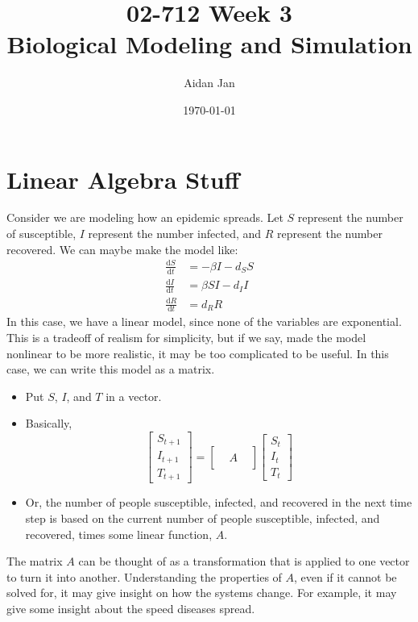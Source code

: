 \documentclass[10pt]{article}
\title{02-712 Week 3 \\ \large{Biological Modeling and Simulation}}
\author{Aidan Jan}
\date{\today}
\newcommand{\dd}{\text{d}}
\begin{document}
\maketitle

\section*{Linear Algebra Stuff}
Consider we are modeling how an epidemic spreads.  Let $S$ represent the number of susceptible, $I$ represent the number infected, and $R$ represent the number recovered.  We can maybe make the model like:
\begin{align*}
    \frac{\dd S}{\dd t} &= -\beta I - d_S S\\
    \frac{\dd I}{\dd t} &= \beta SI - d_I I\\
    \frac{\dd R}{\dd t} &= d_R R
\end{align*}
In this case, we have a linear model, since none of the variables are exponential.  This is a tradeoff of realism for simplicity, but if we say, made the model nonlinear to be more realistic, it may be too complicated to be useful.  In this case, we can write this model as a matrix.
\begin{itemize}
	\item Put $S$, $I$, and $T$ in a vector.
	\item Basically,
	\[\begin{bmatrix} S_{t + 1} \\ I_{t + 1} \\ T_{t + 1} \end{bmatrix} = \begin{bmatrix}
    & & \\ & A & \\ & & \end{bmatrix} \begin{bmatrix} S_{t} \\ I_{t} \\ T_{t} \end{bmatrix}\]
    \item Or, the number of people susceptible, infected, and recovered in the next time step is based on the current number of people susceptible, infected, and recovered, times some linear function, $A$.
\end{itemize}
The matrix $A$ can be thought of as a transformation that is applied to one vector to turn it into another.  Understanding the properties of $A$, even if it cannot be solved for, it may give insight on how the systems change.  For example, it may give some insight about the speed diseases spread.
\end{document}
